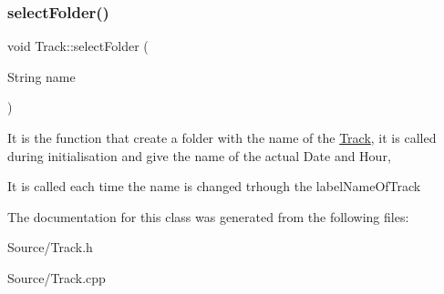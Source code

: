 \subsubsection{\texorpdfstring{selectFolder()}{selectFolder()}}
{\footnotesize\ttfamily void Track\+::select\+Folder (\begin{DoxyParamCaption}\item[{String}]{name }\end{DoxyParamCaption})}

It is the function that create a folder with the name of the \mbox{\hyperlink{class_track}{Track}}, it is called during initialisation and give the name of the actual Date and Hour,
\begin{DoxyItemize}
\item It is called each time the name is changed trhough the label\+Name\+Of\+Track 
\end{DoxyItemize}

The documentation for this class was generated from the following files\+:\begin{DoxyCompactItemize}
\item 
Source/Track.\+h\item 
Source/Track.\+cpp\end{DoxyCompactItemize}
